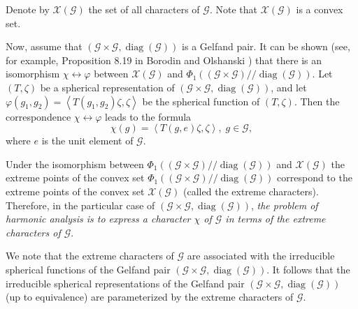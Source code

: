 \documentclass[12pt]{amsart}
\theoremstyle{definition}
\numberwithin{equation}{section}
\DeclareMathOperator{\diag}{diag}
\begin{document}
Denote by $\mathcal{X}\left(\mathcal{G}\right)$ the set of all characters of $\mathcal{G}$. Note that
$\mathcal{X}\left(\mathcal{G}\right)$ is a convex set.

Now, assume that $\left(\mathcal{G}\times\mathcal{G},\diag(\mathcal{G})\right)$ is a Gelfand pair.
It can be shown (see, for example, Proposition 8.19 in Borodin and Olshanski \cite{BorodinOlshanskiBook}) that there is an isomorphism
$\chi\longleftrightarrow\varphi$ between $\mathcal{X}\left(\mathcal{G}\right)$ and
$\Phi_1\left(\left(\mathcal{G}\times \mathcal{G}\right)//\diag(\mathcal{G})\right)$. Let
$\left(T,\zeta\right)$ be a spherical representation of
$\left(\mathcal{G}\times \mathcal{G},\diag\left(\mathcal{G}\right)\right)$,
and let $\varphi(g_1,g_2)=\left<T\left(g_1,g_2\right)\zeta,\zeta\right>$
be the  spherical function of  $\left(T,\zeta\right)$. Then the correspondence $\chi\longleftrightarrow\varphi$ leads to the formula
\begin{equation}\label{MagenDavid}
\chi(g)=\left<T\left(g,e\right)\zeta,\zeta\right>,\; g\in \mathcal{G},
\end{equation}
where $e$ is the unit element of $\mathcal{G}$.

Under the isomorphism  between $\Phi_1\left(\left(\mathcal{G}\times \mathcal{G}\right)//\diag(\mathcal{G})\right)$ and  $\mathcal{X}\left(\mathcal{G}\right)$ the extreme points of the convex set $\Phi_1\left(\left(\mathcal{G}\times \mathcal{G}\right)//\diag(\mathcal{G})\right)$ correspond to
the extreme points of the convex
set $\mathcal{X}\left(\mathcal{G}\right)$ (called the extreme characters).
Therefore, in the particular case of $\left(\mathcal{G}\times\mathcal{G} ,\diag(\mathcal{G})\right)$,
\textit{the problem of harmonic analysis  is  to express a character $\chi$ of $\mathcal{G}$  in terms of the extreme characters of $\mathcal{G}$}.

We note that the extreme characters of $\mathcal{G}$ are associated with the irreducible spherical functions of the Gelfand pair $\left(\mathcal{G}\times\mathcal{G},\diag(\mathcal{G})\right)$. It follows that
the irreducible spherical representations of the Gelfand pair $\left(\mathcal{G}\times\mathcal{G},\diag(\mathcal{G})\right)$ (up to equivalence) are parameterized by the extreme characters of $\mathcal{G}$.
\end{document}
